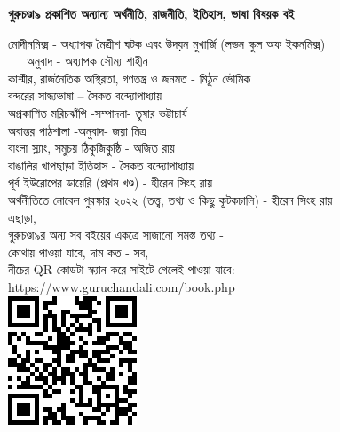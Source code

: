 \clearpage
\small
\centering
\textbf{গুরুচণ্ডা৯ প্রকাশিত অন্যান্য অর্থনীতি, রাজনীতি, ইতিহাস, ভাষা বিষয়ক বই} \\
\raggedright
\scriptsize
মোদীনমিক্স - অধ্যাপক মৈত্রীশ ঘটক এবং উদয়ন মুখার্জি (লন্ডন স্কুল অফ ইকনমিক্স) \\
	~~~অনুবাদ -  অধ্যাপক সৌম্য শাহীন \\
কাশ্মীর, রাজনৈতিক অস্থিরতা, গণতন্ত্র ও জনমত - মিঠুন ভৌমিক \\
বন্দরের সান্ধ্যভাষা -- সৈকত বন্দ্যোপাধ্যায় \\
অপ্রকাশিত মরিচঝাঁপি -সম্পাদনা- তুষার ভট্টাচার্য \\
অবান্তর পাঠশালা -অনুবাদ- জয়া মিত্র \\
বাংলা স্ল্যাং, সমুচয় ঠিকুজিকুষ্ঠি - অজিত রায় \\
বাঙালির খাপছাড়া ইতিহাস - সৈকত বন্দ্যোপাধ্যায় \\
পূর্ব ইউরোপের ডায়েরি (প্রথম খণ্ড) - হীরেন সিংহ রায় \\
অর্থনীতিতে নোবেল পুরস্কার ২০২২ (তত্ত্ব, তথ্য ও কিছু কূটকচালি) - হীরেন সিংহ রায় \\
\baselineskip
\raggedleft
\scriptsize
এছাড়া, \\
গুরুচণ্ডা৯র অন্য সব বইয়ের একত্রে সাজানো সমস্ত তথ্য - \\
কোথায় পাওয়া যাবে, দাম কত - সব, \\
নীচের QR কোডটা স্ক্যান করে সাইটে গেলেই পাওয়া যাবে: \\
https://www.guruchandali.com/book.php \\
\baselineskip
\includegraphics[scale=0.8]{Images/QRCode_2022.png}